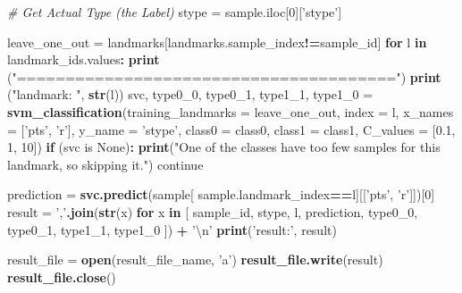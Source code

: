 \documentclass[10pt,letterpaper]{article}
\newenvironment{Shaded}{\begin{snugshade}}{\end{snugshade}}
\newcommand{\KeywordTok}[1]{\textcolor[rgb]{0.13,0.29,0.53}{\textbf{#1}}}
\newcommand{\DataTypeTok}[1]{\textcolor[rgb]{0.13,0.29,0.53}{#1}}
\newcommand{\DecValTok}[1]{\textcolor[rgb]{0.00,0.00,0.81}{#1}}
\newcommand{\FloatTok}[1]{\textcolor[rgb]{0.00,0.00,0.81}{#1}}
\newcommand{\CharTok}[1]{\textcolor[rgb]{0.31,0.60,0.02}{#1}}
\newcommand{\StringTok}[1]{\textcolor[rgb]{0.31,0.60,0.02}{#1}}
\newcommand{\CommentTok}[1]{\textcolor[rgb]{0.56,0.35,0.01}{\textit{#1}}}
\newcommand{\ControlFlowTok}[1]{\textcolor[rgb]{0.13,0.29,0.53}{\textbf{#1}}}
\newcommand{\OperatorTok}[1]{\textcolor[rgb]{0.81,0.36,0.00}{\textbf{#1}}}
\newcommand{\NormalTok}[1]{#1}
\begin{document}
\begin{Shaded}
\begin{Highlighting}[]
    \CommentTok{# Get Actual Type (the Label)}
\NormalTok{    stype =}\StringTok{ }\NormalTok{sample.iloc[}\DecValTok{0}\NormalTok{][}\StringTok{'stype'}\NormalTok{]}

\NormalTok{    leave_one_out =}\StringTok{ }\NormalTok{landmarks[landmarks.sample_index}\OperatorTok{!=}\NormalTok{sample_id]}
    \ControlFlowTok{for}\NormalTok{ l }\ControlFlowTok{in}\NormalTok{ landmark_ids.values}\OperatorTok{:}
\StringTok{        }\KeywordTok{print}\NormalTok{ (}\StringTok{"======================================="}\NormalTok{)}
        \KeywordTok{print}\NormalTok{ (}\StringTok{"landmark: "}\NormalTok{, }\KeywordTok{str}\NormalTok{(l))}
\NormalTok{        svc, type0_}\DecValTok{0}\NormalTok{, type0_}\DecValTok{1}\NormalTok{, type1_}\DecValTok{1}\NormalTok{, type1_}\DecValTok{0}\NormalTok{ =}
\StringTok{            }\KeywordTok{svm_classification}\NormalTok{(}\DataTypeTok{training_landmarks =}\NormalTok{ leave_one_out,}
                                                 \DataTypeTok{index =}\NormalTok{ l,}
                                                 \DataTypeTok{x_names =}\NormalTok{ [}\StringTok{'pts'}\NormalTok{, }\StringTok{'r'}\NormalTok{],}
                                                 \DataTypeTok{y_name =} \StringTok{'stype'}\NormalTok{,}
                                                 \DataTypeTok{class0 =}\NormalTok{ class0,}
                                                 \DataTypeTok{class1 =}\NormalTok{ class1,}
                                                 \DataTypeTok{C_values =}\NormalTok{ [}\FloatTok{0.1}\NormalTok{, }\DecValTok{1}\NormalTok{, }\DecValTok{10}\NormalTok{])}
        \ControlFlowTok{if}\NormalTok{ (svc is None)}\OperatorTok{:}
\StringTok{            }\KeywordTok{print}\NormalTok{(}\StringTok{"One of the classes have too few samples}
\StringTok{                for this landmark, so skipping it."}\NormalTok{)}
\NormalTok{            continue}

\NormalTok{        prediction =}\StringTok{ }\KeywordTok{svc.predict}\NormalTok{(sample[}
\NormalTok{          sample.landmark_index}\OperatorTok{==}\NormalTok{l][[}\StringTok{'pts'}\NormalTok{, }\StringTok{'r'}\NormalTok{]])[}\DecValTok{0}\NormalTok{]}
\NormalTok{        result =}\StringTok{ ','}\KeywordTok{.join}\NormalTok{(}\KeywordTok{str}\NormalTok{(x) }\ControlFlowTok{for}\NormalTok{ x }\ControlFlowTok{in}\NormalTok{ [}
\NormalTok{          sample_id, stype, l, prediction,}
\NormalTok{            type0_}\DecValTok{0}\NormalTok{, type0_}\DecValTok{1}\NormalTok{, type1_}\DecValTok{1}\NormalTok{, type1_}\DecValTok{0}\NormalTok{ ]) }\OperatorTok{+}\StringTok{ '}\CharTok{\textbackslash{}n}\StringTok{'}
        \KeywordTok{print}\NormalTok{(}\StringTok{'result:'}\NormalTok{, result)}

\NormalTok{        result_file =}\StringTok{ }\KeywordTok{open}\NormalTok{(result_file_name, }\StringTok{'a'}\NormalTok{)}
        \KeywordTok{result_file.write}\NormalTok{(result)}
        \KeywordTok{result_file.close}\NormalTok{()}
\end{Highlighting}
\end{Shaded}
\end{document}

